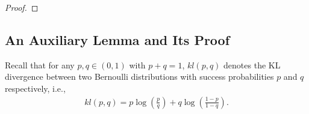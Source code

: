 \documentclass[11pt]{article}
\newcommand{\1}{\mathbbm{1}}
\begin{document}
\begin{proof}
\end{proof}


\subsection{An Auxiliary Lemma and Its Proof}\label{sec:aux}

Recall that for any $p,q\in (0,1)$ with $p+ q=1$, $kl(p,q)$ denotes the KL divergence between two Bernoulli distributions with success probabilities $p$ and $q$ respectively, i.e.,
\begin{align*}
    kl(p,q)=p\log\left(\frac{p}{q}\right)+q\log\left(\frac{1-p}{1-q}\right).
\end{align*}
\end{document}
